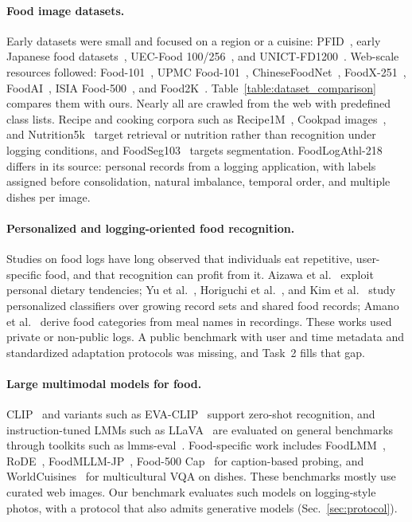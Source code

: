 \documentclass[sigconf, nonacm]{acmart}
\begin{document}
\paragraph{Food image datasets.} Early datasets were small and focused on a region or a cuisine: PFID~\cite{chen2009pfid}, early Japanese food datasets~\cite{joutou2009food,hoashi2010image,matsuda2012multiple}, UEC-Food 100/256~\cite{kawano2015automatic}, and UNICT-FD1200~\cite{farinella2016retrieval}. Web-scale resources followed: Food-101~\cite{bossard2014food}, UPMC Food-101~\cite{wang2015recipe}, ChineseFoodNet~\cite{chen2017chinesefoodnet}, FoodX-251~\cite{kaur2019foodx}, FoodAI~\cite{sahoo2019foodai}, ISIA Food-500~\cite{min2020isia}, and Food2K~\cite{min2023large}. Table~\ref{table:dataset_comparison} compares them with ours. Nearly all are crawled from the web with predefined class lists. Recipe and cooking corpora such as Recipe1M~\cite{marin2019learning}, Cookpad images~\cite{harashima2017cookpad}, and Nutrition5k~\cite{thames2021nutrition5k} target retrieval or nutrition rather than recognition under logging conditions, and FoodSeg103~\cite{wu2021large} targets segmentation. FoodLogAthl-218 differs in its source: personal records from a logging application, with labels assigned before consolidation, natural imbalance, temporal order, and multiple dishes per image.

\paragraph{Personalized and logging-oriented food recognition.} Studies on food logs have long observed that individuals eat repetitive, user-specific food, and that recognition can profit from it. Aizawa et al.~\cite{Aizawa2013FoodBalance} exploit personal dietary tendencies; Yu et al.~\cite{flg469}, Horiguchi et al.~\cite{Horiguchi2018Personalized}, and Kim et al.~\cite{Kim2021Boosting} study personalized classifiers over growing record sets and shared food records; Amano et al.~\cite{Amano2015FoodCategory} derive food categories from meal names in recordings. These works used private or non-public logs. A public benchmark with user and time metadata and standardized adaptation protocols was missing, and Task~2 fills that gap.

\paragraph{Large multimodal models for food.} CLIP~\cite{CLIP} and variants such as EVA-CLIP~\cite{sun2023eva} support zero-shot recognition, and instruction-tuned LMMs such as LLaVA~\cite{liu2024visual,liu2024improved} are evaluated on general benchmarks through toolkits such as lmms-eval~\cite{lmms_eval2024,zhang2024lmmsevalrealitycheckevaluation}. Food-specific work includes FoodLMM~\cite{yin2023foodlmm}, RoDE~\cite{jiao2024rode}, FoodMLLM-JP~\cite{Imajuku2025FoodMLLM}, Food-500 Cap~\cite{ma2023food} for caption-based probing, and WorldCuisines~\cite{winata2024worldcuisines} for multicultural VQA on dishes. These benchmarks mostly use curated web images. Our benchmark evaluates such models on logging-style photos, with a protocol that also admits generative models (Sec.~\ref{sec:protocol}).
\end{document}
